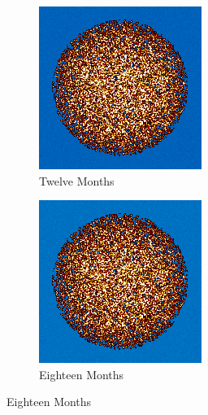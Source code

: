 \begin{figure}[H]\ContinuedFloat
\centering

\begin{subfigure}{0.31\textwidth}
  \includegraphics[width=0.9\linewidth]{figures/burn-20-bstep2}
  \caption{Twelve Months}
  \label{fig:bstep2}
\end{subfigure}%
%
\begin{subfigure}{0.31\textwidth}
  \includegraphics[width=0.9\linewidth]{figures/burn-20-bstep3}
  \caption{Eighteen Months}
  \label{fig:bstep3}
\end{subfigure}%


\end{figure}

